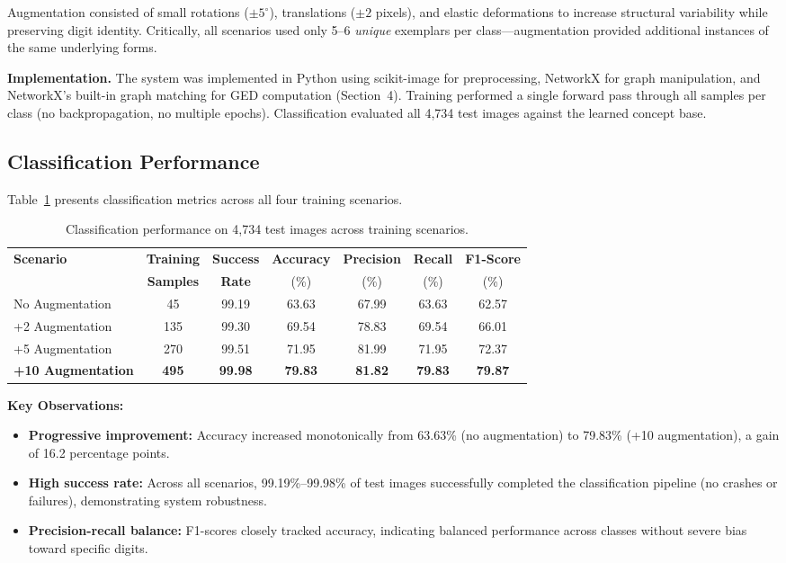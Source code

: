 \documentclass[12pt, a4paper]{article}
\begin{document}
Augmentation consisted of small rotations ($\pm 5^\circ$), translations ($\pm 2$ pixels), and elastic deformations to increase structural variability while preserving digit identity. Critically, all scenarios used only 5--6 \emph{unique} exemplars per class---augmentation provided additional instances of the same underlying forms.

\textbf{Implementation.} The system was implemented in Python using scikit-image for preprocessing, NetworkX for graph manipulation, and NetworkX's built-in graph matching for GED computation (Section~4). Training performed a single forward pass through all samples per class (no backpropagation, no multiple epochs). Classification evaluated all 4,734 test images against the learned concept base.

\subsection{Classification Performance}

Table~\ref{tab:results} presents classification metrics across all four training scenarios.

\begin{table}[h]
\centering
\caption{Classification performance on 4,734 test images across training scenarios.}
\label{tab:results}
\begin{tabular}{lcccccc}
\toprule
\textbf{Scenario} & \textbf{Training} & \textbf{Success} & \textbf{Accuracy} & \textbf{Precision} & \textbf{Recall} & \textbf{F1-Score} \\
 & \textbf{Samples} & \textbf{Rate} & (\%) & (\%) & (\%) & (\%) \\
\midrule
No Augmentation & 45 & 99.19 & 63.63 & 67.99 & 63.63 & 62.57 \\
+2 Augmentation & 135 & 99.30 & 69.54 & 78.83 & 69.54 & 66.01 \\
+5 Augmentation & 270 & 99.51 & 71.95 & 81.99 & 71.95 & 72.37 \\
\textbf{+10 Augmentation} & \textbf{495} & \textbf{99.98} & \textbf{79.83} & \textbf{81.82} & \textbf{79.83} & \textbf{79.87} \\
\bottomrule
\end{tabular}
\end{table}

\textbf{Key Observations:}
\begin{itemize}
\item \textbf{Progressive improvement:} Accuracy increased monotonically from 63.63\% (no augmentation) to 79.83\% (+10 augmentation), a gain of 16.2 percentage points.
\item \textbf{High success rate:} Across all scenarios, 99.19\%--99.98\% of test images successfully completed the classification pipeline (no crashes or failures), demonstrating system robustness.
\item \textbf{Precision-recall balance:} F1-scores closely tracked accuracy, indicating balanced performance across classes without severe bias toward specific digits.
\end{itemize}
\end{document}
